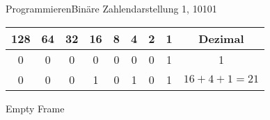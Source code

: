 \begin{frame}{Programmieren}{Binäre Zahlendarstellung}
		1,
		10101
		
		\begin{tabular}{cccccccc|c}
		128 & 64 & 32 & 16 & 8 & 4 & 2 & 1 & Dezimal \\ \hline 
		0   & 0  & 0  & 0  & 0 & 0 & 0 & 1 & 1 \\ 
		0   & 0  & 0  & 1  & 0 & 1 & 0 & 1 & $16 + 4 + 1 = 21$ \\ 
		\hline 
		\end{tabular} 	
\end{frame}

\begin{frame}[plain]
	Empty Frame
\end{frame}














